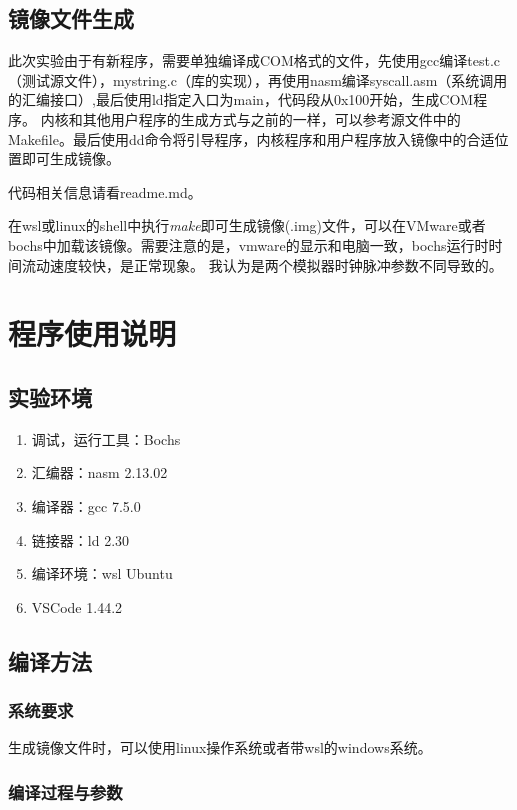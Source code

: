 \documentclass[a4paper, 11pt]{article} %
\begin{document}
\subsection{镜像文件生成}

此次实验由于有新程序，需要单独编译成COM格式的文件，先使用gcc编译test.c（测试源文件），mystring.c（库的实现），再使用nasm编译syscall.asm（系统调用的汇编接口）,最后使用ld指定入口为main，代码段从0x100开始，生成COM程序。
内核和其他用户程序的生成方式与之前的一样，可以参考源文件中的Makefile。最后使用dd命令将引导程序，内核程序和用户程序放入镜像中的合适位置即可生成镜像。

代码相关信息请看readme.md。

在wsl或linux的shell中执行\textit{make}即可生成镜像(.img)文件，可以在VMware或者bochs中加载该镜像。需要注意的是，vmware的显示和电脑一致，bochs运行时时间流动速度较快，是正常现象。
我认为是两个模拟器时钟脉冲参数不同导致的。

\section{程序使用说明}
\subsection{实验环境}
\begin{enumerate}
  \item 调试，运行工具：Bochs
  \item 汇编器：nasm 2.13.02
  \item 编译器：gcc 7.5.0
  \item 链接器：ld 2.30
  \item 编译环境：wsl Ubuntu
  \item VSCode 1.44.2
\end{enumerate}

\subsection{编译方法}

\subsubsection{系统要求}

生成镜像文件时，可以使用linux操作系统或者带wsl的windows系统。

\subsubsection{编译过程与参数}
\end{document}
